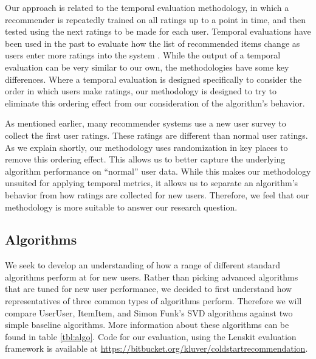 \documentclass[letterpaper]{sig-alternate}
\begin{document}
  Our approach is related to the temporal evaluation methodology, in which a recommender is repeatedly trained on all ratings up to a point in time, and then tested using the next ratings to be made for each user.
  Temporal evaluations have been used in the past to evaluate how the list of recommended items change as users enter more ratings into the system \cite{LathiaTemporal}.
  While the output of a temporal evaluation can be very similar to our own, the methodologies have some key differences.
  Where a temporal evaluation is designed specifically to consider the order in which users make ratings, our methodology is designed to try to eliminate this ordering effect from our consideration of the algorithm's behavior.

  As mentioned earlier, many recommender systems use a new user survey to collect the first user ratings.
  These ratings are different than normal user ratings.
  As we explain shortly, our methodology uses randomization in key places to remove this ordering effect.
  This allows us to better capture the underlying algorithm performance on ``normal'' user data.
  While this makes our methodology unsuited for applying temporal metrics, it allows us to separate an algorithm's behavior from how ratings are collected for new users.
  Therefore, we feel that our methodology is more suitable to answer our research question.

  \subsection*{Algorithms}

  We seek to develop an understanding of how a range of different standard algorithms perform at for new users.
  Rather than picking advanced algorithms that are tuned for new user performance, we decided to first understand how representatives of three common types of algorithms perform.
  Therefore we will compare UserUser\cite{resnick1994grouplens}, ItemItem\cite{sarwar2001item}, and Simon Funk's SVD\cite{funk_netflix_2006} algorithms against two simple baseline algorithms.
  More information about these algorithms can be found in table \ref{tbl:algo}.
  Code for our evaluation, using the Lenskit evaluation framework \cite{lenskit} is available at \url{https://bitbucket.org/kluver/coldstartrecommendation}.
  
\end{document}
